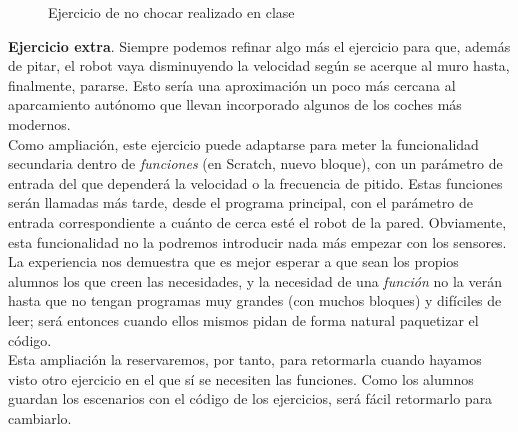 \begin{description}
\begin{figure}[h]
	\centering
	
	\begin{subfigure}
		[Un ejemplo de solución para el ejercicio de no chocar]{
			\texttt{[image: muro1.png]}	
			\label{img:muro1}
		}
	\end{subfigure}
	\begin{subfigure}
		[Otro ejemplo de solución para el ejercicio de no chocar]{
			\texttt{[image: muro2.png]}	
			\label{img:muro2}
		}
	\end{subfigure}
	
	\caption{Ejercicio de no chocar realizado en clase}
	\label{img:muroEjercicio}
\end{figure}

\textbf{Ejercicio extra}. Siempre podemos refinar algo más el ejercicio para que, además de pitar, el robot vaya disminuyendo la velocidad según se acerque al muro hasta, finalmente, pararse. Esto sería una aproximación un poco más cercana al aparcamiento autónomo que llevan incorporado algunos de los coches más modernos.\\
Como ampliación, este ejercicio puede adaptarse para meter la funcionalidad secundaria dentro de \textit{funciones} (en Scratch, nuevo bloque), con un parámetro de entrada del que dependerá la velocidad o la frecuencia de pitido. Estas funciones serán llamadas más tarde, desde el programa principal, con el parámetro de entrada correspondiente a cuánto de cerca esté el robot de la pared. Obviamente, esta funcionalidad no la podremos introducir nada más empezar con los sensores. La experiencia nos demuestra que es mejor esperar a que sean los propios alumnos los que creen las necesidades, y la necesidad de una \textit{función} no la verán hasta que no tengan programas muy grandes (con muchos bloques) y difíciles de leer; será entonces cuando ellos mismos pidan de forma natural paquetizar el código.\\
Esta ampliación la reservaremos, por tanto, para retormarla cuando hayamos visto otro ejercicio en el que sí se necesiten las funciones. Como los alumnos guardan los escenarios con el código de los ejercicios, será fácil retormarlo para cambiarlo.


\end{description}
